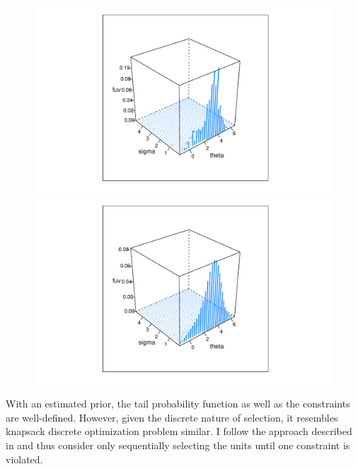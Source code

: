 \documentclass[12pt]{article}
\begin{document}
\begin{figure}[h!]
    \centering
    \begin{minipage}{0.5\textwidth}
        \centering
        \includegraphics[width=\textwidth]{../../Figures/2013-2022/GMM_fd/GLVmix.pdf}
    \end{minipage}\hfill
    \begin{minipage}{0.5\textwidth}
        \centering
        \includegraphics[width=\textwidth]{../../Figures/2013-2022/GMM_fd/GLVmix_s.pdf}
    \end{minipage}
    \label{fig:GLVmix}
\end{figure}

With an estimated prior, the tail probability function as well as the
constraints are well-defined. However, given the discrete nature of selection,
it resembles knapsack discrete optimization problem similar. I follow the
approach described in \cite{basu2018weighted} and thus consider only
sequentially selecting the units until one constraint is violated.
\end{document}
